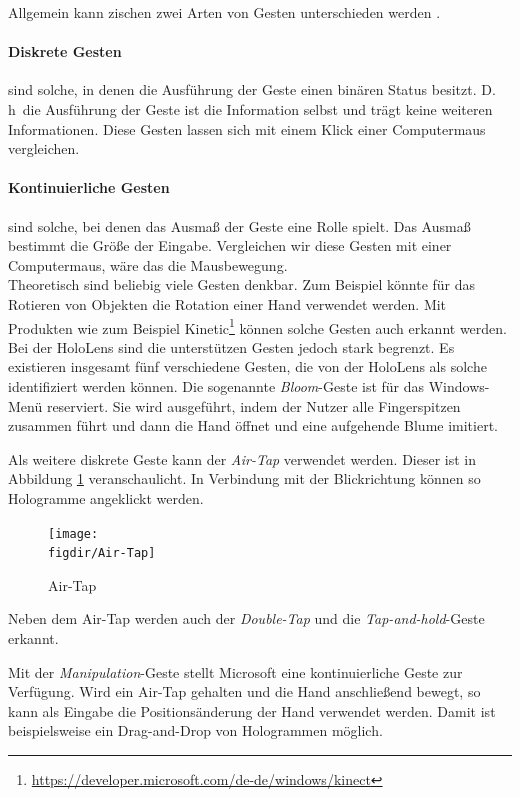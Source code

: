 Allgemein kann zischen zwei Arten von Gesten unterschieden werden \cite{windows2017gesture}.

\paragraph{Diskrete Gesten} sind solche, in denen die Ausführung der Geste einen binären Status besitzt. D.\,h\ die Ausführung der Geste ist die Information selbst und trägt keine weiteren Informationen. Diese Gesten lassen sich mit einem Klick einer Computermaus vergleichen.

\paragraph{Kontinuierliche Gesten} sind solche, bei denen das Ausmaß der Geste eine Rolle spielt. Das Ausmaß bestimmt die Größe der Eingabe. Vergleichen wir diese Gesten mit einer Computermaus, wäre das die Mausbewegung.\\

Theoretisch sind beliebig viele Gesten denkbar. Zum Beispiel könnte für das Rotieren von Objekten die Rotation einer Hand verwendet werden. Mit Produkten wie zum Beispiel Kinetic\footnote{\url{https://developer.microsoft.com/de-de/windows/kinect}} können solche Gesten auch erkannt werden. Bei der HoloLens sind die unterstützen Gesten jedoch stark begrenzt. Es existieren insgesamt fünf verschiedene Gesten, die von der HoloLens als solche identifiziert werden können. Die sogenannte \textit{Bloom}-Geste ist für das Windows-Menü reserviert. Sie wird ausgeführt, indem der Nutzer alle Fingerspitzen zusammen führt und dann die Hand öffnet und eine aufgehende Blume imitiert.

Als weitere diskrete Geste kann der \textit{Air-Tap} verwendet werden. Dieser ist in Abbildung \ref{fig:Air-Tap} veranschaulicht. In Verbindung mit der Blickrichtung können so Hologramme angeklickt werden.

\begin{figure}[htb]
  \texttt{[image: \\figdir/Air-Tap]}
  \caption{Air-Tap \cite{windows2017gesture}}
  \label{fig:Air-Tap}
\end{figure}

Neben dem Air-Tap werden auch der \textit{Double-Tap} und die \textit{Tap-and-hold}-Geste erkannt.

Mit der \textit{Manipulation}-Geste stellt Microsoft eine kontinuierliche Geste zur Verfügung. Wird ein Air-Tap gehalten und die Hand anschließend bewegt, so kann als Eingabe die Positionsänderung der Hand verwendet werden. Damit ist beispielsweise ein Drag-and-Drop von Hologrammen möglich.

